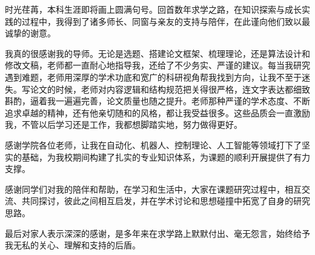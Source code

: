 
\begin{acknowledgements}

时光荏苒，本科生涯即将画上圆满句号。回首数年求学之路，在知识探索与成长实践的过程中，我得到了诸多师长、同窗与亲友的支持与陪伴，在此谨向他们致以最诚挚的谢意。

我真的很感谢我的导师。无论是选题、搭建论文框架、梳理理论，还是算法设计和修改文稿，老师都一直耐心地指导我，还给了不少务实、严谨的建议。每当我研究遇到难题，老师用深厚的学术功底和宽广的科研视角帮我找到方向，让我不至于迷失。写论文的时候，老师对内容逻辑和结构规范把关得很严格，连文字表达都细致斟酌，逼着我一遍遍完善，论文质量也随之提升。老师那种严谨的学术态度、不断追求卓越的精神，还有他亲切随和的风格，都让我受益很多。这些品质会一直激励我，不管以后学习还是工作，我都想脚踏实地，努力做得更好。

感谢学院各位老师，让我在自动化、机器人、控制理论、人工智能等领域打下了坚实的基础，为我校期间构建了扎实的专业知识体系，为课题的顺利开展提供了有力支撑。

感谢同学们对我的陪伴和帮助，在学习和生活中，大家在课题研究过程中，相互交流、共同探讨，彼此之间相互启发，并在学术讨论和思想碰撞中拓宽了自身的研究思路。

最后对家人表示深深的感谢，是多年来在求学路上默默付出、毫无怨言，始终给予我无私的关心、理解和支持的后盾。

\end{acknowledgements}
